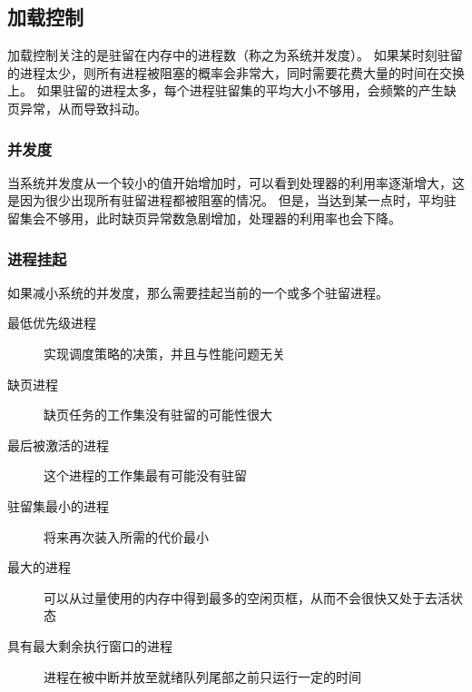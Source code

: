 {    \subsection{加载控制}
    {
        加载控制关注的是驻留在内存中的进程数（称之为系统并发度）。
        如果某时刻驻留的进程太少，则所有进程被阻塞的概率会非常大，同时需要花费大量的时间在交换上。
        如果驻留的进程太多，每个进程驻留集的平均大小不够用，会频繁的产生缺页异常，从而导致抖动。

        \subsubsection{并发度}
        {
            当系统并发度从一个较小的值开始增加时，可以看到处理器的利用率逐渐增大，这是因为很少出现所有驻留进程都被阻塞的情况。
            但是，当达到某一点时，平均驻留集会不够用，此时缺页异常数急剧增加，处理器的利用率也会下降。
        }

        \subsubsection{进程挂起}
        {
            如果减小系统的并发度，那么需要挂起当前的一个或多个驻留进程。

            \begin{description}
                \item[最低优先级进程] 实现调度策略的决策，并且与性能问题无关
                \item[缺页进程] 缺页任务的工作集没有驻留的可能性很大
                \item[最后被激活的进程] 这个进程的工作集最有可能没有驻留
                \item[驻留集最小的进程] 将来再次装入所需的代价最小
                \item[最大的进程] 可以从过量使用的内存中得到最多的空闲页框，从而不会很快又处于去活状态
                \item[具有最大剩余执行窗口的进程] 进程在被中断并放至就绪队列尾部之前只运行一定的时间
            \end{description}
        }
    }
}
